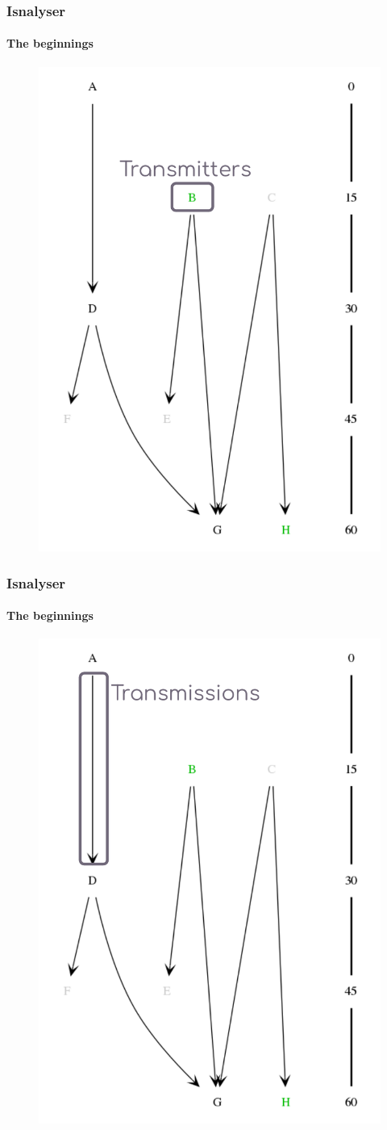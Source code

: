 \documentclass[9pt]{beamer}
\begin{document}
\begin{frame}
\frametitle{Isnalyser}
\framesubtitle{The beginnings}
\begin{figure}
	\includegraphics[width=.5\linewidth]{figures/isnalyser_parts_1.pdf}
\end{figure}
\end{frame} 
\begin{frame}
\frametitle{Isnalyser}
\framesubtitle{The beginnings}
\begin{figure}
	\includegraphics[width=.5\linewidth]{figures/isnalyser_parts_2.pdf}
\end{figure}
\end{frame} 
\end{document}
